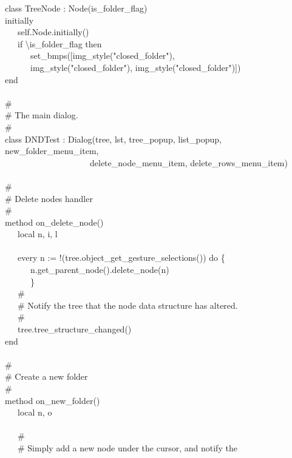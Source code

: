 {class TreeNode : Node(is\_folder\_flag) \\
\>   initially \\
\>   \ \ \ self.Node.initially() \\
\>   \ \ \ if {\textbackslash}is\_folder\_flag then \\
\>   \ \ \ \ \ \ set\_bmps([img\_style("closed\_folder"), \\
\>   \ \ \ \ \ \ img\_style("closed\_folder"),
img\_style("closed\_folder")]) \\
end \\
\ \\
\# \\
\# The main dialog. \\
\# \\
class DNDTest : Dialog(tree, lst, tree\_popup, list\_popup, new\_folder\_menu\_item,  \\
\>   \ \ \ \ \ \ \ \ \ \ \ \ \ \ \ \ \ \ \ \ delete\_node\_menu\_item, delete\_rows\_menu\_item) \\
\ \\
\>   \# \\
\>   \# Delete nodes handler \\
\>   \# \\
\>   method on\_delete\_node() \\
\>   \ \ \ local n, i, l \\
\ \\
\>   \ \ \ every n := !(tree.object\_get\_gesture\_selections()) do \{ \\
\>   \ \ \ \ \ \ n.get\_parent\_node().delete\_node(n) \\
\>   \ \ \ \ \ \ \} \\
\>   \ \ \ \# \\
\>   \ \ \ \# Notify the tree that the node data structure has
altered. \\
\>   \ \ \ \# \\
\>   \ \ \ tree.tree\_structure\_changed() \\
\>   end \\
\ \\
\>   \# \\
\>   \# Create a new folder \\
\>   \# \\
\>   method on\_new\_folder() \\
\>   \ \ \ local n, o \\
\ \\
\>   \ \ \ \# \\
\>   \ \ \ \# Simply add a new node under the cursor, and notify the \\
}
